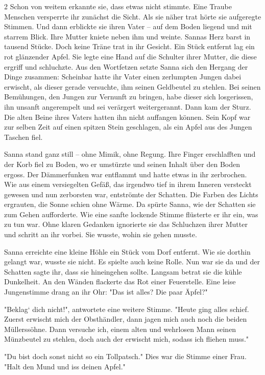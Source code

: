 \documentclass[10pt, a4paper, oneside]{book}
\begin{document}
\begin{multicols}{2}
Schon von weitem erkannte sie, dass etwas nicht stimmte. Eine Traube Menschen versperrte ihr zunächst die Sicht. Als sie näher trat hörte sie aufgeregte Stimmen. Und dann erblickte sie ihren Vater – auf dem Boden liegend und mit starrem Blick. Ihre Mutter kniete neben ihm und weinte. Sannas Herz barst in tausend Stücke. Doch keine Träne trat in ihr Gesicht. Ein Stück entfernt lag ein rot glänzender Apfel. Sie legte eine Hand auf die Schulter ihrer Mutter, die diese ergriff und schluchzte. Aus den Wortfetzen setzte Sanna sich den Hergang der Dinge zusammen: Scheinbar hatte ihr Vater einen zerlumpten Jungen dabei erwischt, als dieser gerade versuchte, ihm seinen Geldbeutel zu stehlen. Bei seinen Bemühungen, den Jungen zur Vernunft zu bringen, habe dieser sich losgerissen, ihn unsanft angerempelt und sei verärgert weitergerannt. Dann kam der Sturz. Die alten Beine ihres Vaters hatten ihn nicht auffangen können. Sein Kopf war zur selben Zeit auf einen spitzen Stein geschlagen, als ein Apfel aus des Jungen Taschen fiel.\bigskip

Sanna stand ganz still – ohne Mimik, ohne Regung. Ihre Finger erschlafften und der Korb fiel zu Boden, wo er umstürzte und seinen Inhalt über den Boden ergoss. Der Dämmerfunken war entflammt und hatte etwas in ihr zerbrochen. Wie aus einem versiegelten Gefäß, das irgendwo tief in ihrem Inneren versteckt gewesen und nun zerborsten war, entströmte der Schatten. Die Farben des Lichts ergrauten, die Sonne schien ohne Wärme. Da spürte Sanna, wie der Schatten sie zum Gehen aufforderte. Wie eine sanfte lockende Stimme flüsterte er ihr ein, was zu tun war. Ohne klaren Gedanken ignorierte sie das Schluchzen ihrer Mutter und schritt an ihr vorbei. Sie wusste, wohin sie gehen musste.\bigskip

Sanna erreichte eine kleine Höhle ein Stück vom Dorf entfernt. Wie sie dorthin gelangt war, wusste sie nicht. Es spielte auch keine Rolle. Nun war sie da und der Schatten sagte ihr, dass sie hineingehen sollte. Langsam betrat sie die kühle Dunkelheit. An den Wänden flackerte das Rot einer Feuerstelle. Eine leise Jungenstimme drang an ihr Ohr: "Das ist alles? Die paar Äpfel?"\bigskip

"Beklag‘ dich nicht!", antwortete eine weitere Stimme. "Heute ging alles schief. Zuerst erwischt mich der Obsthändler, dann jagen mich auch noch die beiden Müllerssöhne. Dann versuche ich, einem alten und wehrlosen Mann seinen Münzbeutel zu stehlen, doch auch der erwischt mich, sodass ich fliehen muss."\bigskip

"Du bist doch sonst nicht so ein Tollpatsch." Dies war die Stimme einer Frau. "Halt den Mund und iss deinen Apfel."\bigskip


\end{multicols}
\end{document}
